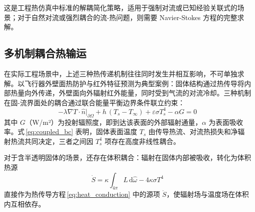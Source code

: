 这是工程热仿真中标准的解耦简化策略，适用于强制对流或已知经验关联式的场景；对于自然对流或强烈耦合的流-热问题，则需要 Navier-Stokes 方程的完整求解。

\subsection{多机制耦合热输运}

在实际工程场景中，上述三种热传递机制往往同时发生并相互影响，不可单独求解。以飞行器外壁面热防护与红外特征预测为典型案例\cite{modestRadiativeHeatTransfer2013}：固体结构通过热传导将内部热量向外传递，外壁面向外辐射红外能量，同时受到气流的对流冷却。三种机制在固-流界面处的耦合通过联合能量平衡边界条件联立约束：
\begin{equation}
    -\lambda \nabla T \cdot \hat{n}\big|_{\partial\Omega}
    + h\,(T_s - T_\infty)
    + \varepsilon\sigma T_s^4
    - \alpha G
    = 0
    \label{eq:coupled_bc}
\end{equation}
其中 $G$（W/m²）为投射辐照度，即到达该表面的外部辐射通量，$\alpha$ 为表面吸收率。式\,\eqref{eq:coupled_bc} 表明，固体表面温度 $T_s$ 由传导热流、对流热损失和净辐射热流共同决定，三者之间因 $T_s^4$ 项存在高度非线性耦合。

对于含半透明固体的场景，还存在体积耦合：辐射在固体内部被吸收，转化为体积热源
\begin{equation}
    \dot{S} = \kappa \int_{4\pi} L \, \mathrm{d}\hat{\omega} - 4\kappa \sigma T^4
\end{equation}
直接作为热传导方程\,\eqref{eq:heat_conduction} 中的源项 $\dot{S}$，使辐射场与温度场在体积内互相依存。

